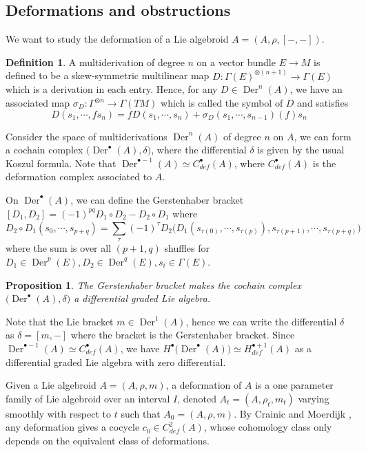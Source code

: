\documentclass[12pt]{amsart}
\newtheorem{prop}[thm]{Proposition}
\theoremstyle{definition}
\newtheorem{defn}[thm]{Definition}
\theoremstyle{remark}
\numberwithin{equation}{section}
\newcommand{\1}{{\mathbb{1}}}
\newcommand{\der}{\operatorname{Der}}
\begin{document}
\subsection{Deformations and obstructions}
We want to study the deformation of a Lie algebroid $A=(A,\rho,[-,-])$. 
\begin{defn}
	A multiderivation of degree $n$ on a vector bundle $E\to M$ is defined to be a skew-symmetric multilinear map  $D:\Gamma(E)^{\otimes (n+1)}\to \Gamma(E)$ which is a derivation in each entry. Hence, for any $D\in \der^n(A)$, we have an associated map $\sigma_D: \Gamma^{\otimes n}\to \Gamma(TM)$ which is called the symbol of $D$ and satisfies
	\begin{equation*}
	D(s_1,\cdots,fs_n)=fD(s_1,\cdots, s_n)+\sigma_D(s_1,\cdots,s_{n-1})(f)s_n
	\end{equation*}
\end{defn}


Consider the space of multiderivations $\der^n(A)$ of degree $n$ on $A$, we can form a cochain complex  $\big(\der^{\bullet}(A), \delta\big)$, where the differential $\delta$ is given by the usual Koszul formula. Note that $\der^{\bullet-1}(A) \simeq C^{\bullet}_{def}(A)$, where $C^{\bullet}_{def}(A)$ is the deformation complex associated to $A$.

On $\der^{\bullet}(A)$, we can define the Gerstenhaber bracket $[D_1,D_2]=(-1)^{pq}D_1\circ D_2-D_2\circ D_1$ where
\begin{equation*}
D_2\circ D_1(s_0,\cdots,s_{p+q})=\sum_{\tau}^{}(-1)^{\tau}D_2\big(D_1(s_{\tau(0)},\cdots, s_{\tau(p)}), s_{\tau(p+1)},\cdots, s_{\tau(p+q)} \big)
\end{equation*}
where the sum is over all $(p+1,q)$ shuffles for $D_1\in \der^p(E), D_2\in \der^q(E), s_i\in \Gamma(E)$.
\begin{prop}
	The Gerstenhaber bracket makes the cochain complex $\big(\der^{\bullet}(A), \delta\big)$ a differential graded Lie algebra.
\end{prop}
Note that the Lie bracket $m\in \der^1(A)$, hence we can write the differential $\delta$ as $\delta=[m,-]$ where the bracket is the Gerstenhaber bracket. Since $\der^{\bullet-1}(A) \simeq C^{\bullet}_{def}(A)$, we have $H^{\bullet}\big(\der^{\bullet}(A)\big) \simeq H^{\bullet+1}_{def}(A)$ as a differential graded Lie algebra with zero differential.

Given a Lie algebroid $A=(A,\rho,m)$, a deformation of $A$ is a one parameter family of Lie algebroid over an interval $I$, denoted $A_t=(A,\rho_t,m_t)$ varying smoothly with respect to $t$ such that $A_0=(A,\rho,m)$. By Crainic and Moerdijk \cite{CM04}, any deformation gives a cocycle $c_0\in C^2_{def}(A)$, whose cohomology class only depends on the equivalent class of deformations. 
\end{document}
